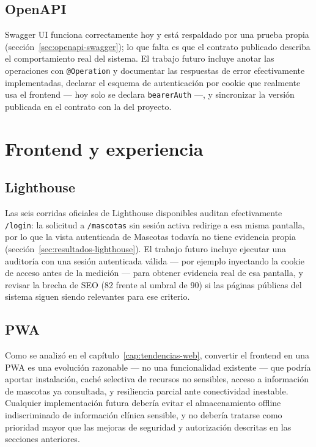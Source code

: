 \subsection{OpenAPI}
\label{sec:futuro-openapi}

Swagger UI funciona correctamente hoy y est\'a respaldado por una prueba
propia (secci\'on~\ref{sec:openapi-swagger}); lo que falta es que el
contrato publicado describa el comportamiento real del sistema. El trabajo
futuro incluye anotar las operaciones con \texttt{@Operation} y documentar
las respuestas de error efectivamente implementadas, declarar el esquema de
autenticaci\'on por cookie que realmente usa el frontend --- hoy solo se
declara \texttt{bearerAuth} ---, y sincronizar la versi\'on publicada en el
contrato con la del proyecto.

\section{Frontend y experiencia}
\label{sec:futuro-frontend}

\subsection{Lighthouse}
\label{sec:futuro-lighthouse}

Las seis corridas oficiales de Lighthouse disponibles auditan efectivamente
\texttt{/login}: la solicitud a \texttt{/mascotas} sin sesi\'on activa
redirige a esa misma pantalla, por lo que la vista autenticada de Mascotas
todav\'ia no tiene evidencia propia
(secci\'on~\ref{sec:resultados-lighthouse}). El trabajo futuro incluye
ejecutar una auditor\'ia con una sesi\'on autenticada v\'alida --- por
ejemplo inyectando la cookie de acceso antes de la medici\'on --- para
obtener evidencia real de esa pantalla, y revisar la brecha de SEO (82
frente al umbral de 90) si las p\'aginas p\'ublicas del sistema siguen
siendo relevantes para ese criterio.

\subsection{PWA}
\label{sec:futuro-pwa}

Como se analiz\'o en el cap\'itulo~\ref{cap:tendencias-web}, convertir el
frontend en una PWA es una evoluci\'on razonable --- no una funcionalidad
existente --- que podr\'ia aportar instalaci\'on, cach\'e selectiva de
recursos no sensibles, acceso a informaci\'on de mascotas ya consultada, y
resiliencia parcial ante conectividad inestable. Cualquier implementaci\'on
futura deber\'ia evitar el almacenamiento offline indiscriminado de
informaci\'on cl\'inica sensible, y no deber\'ia tratarse como prioridad
mayor que las mejoras de seguridad y autorizaci\'on descritas en las
secciones anteriores.

